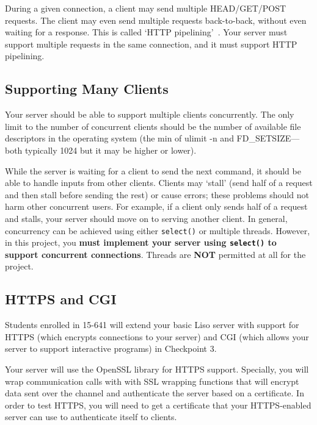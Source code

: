 \vspace{5pt}

 During a given connection, a client may send multiple HEAD/GET/POST requests.
The client may even send multiple requests back-to-back, without even waiting for a response.
This is called `HTTP pipelining'~\cite{pipelining}. Your server must support multiple requests in the same connection, and it must support HTTP pipelining.

\subsection{Supporting Many Clients}
Your server should be able to support multiple clients concurrently. The only
limit to the number of concurrent clients should be the number of available
file descriptors in the operating system (the min of ulimit -n and
FD\_SETSIZE---both typically 1024 but it may be higher or lower).  


While the server is waiting for a client to
send the next command, it should be able to handle inputs from other clients.
Clients may `stall' (send half of a request and then stall before sending the rest) or cause errors; these problems should not harm other concurrent users.
For example, if a client only sends half of a request and stalls, your server should move on to serving another client.
In general, concurrency can be achieved using either \texttt{select()} or
multiple threads. However, in this project, you \textbf{must implement your
server using \texttt{select()} to support concurrent connections}. Threads are
\textbf{NOT} permitted at all for the project. 

\subsection{HTTPS and CGI}
Students enrolled in 15-641 will extend your basic Liso server with support for HTTPS (which encrypts connections to your server) and CGI (which allows your server to support interactive programs) in Checkpoint 3.

\vspace{5pt}

Your server will use the OpenSSL library for HTTPS support.  Specially, you will wrap communication calls with with SSL wrapping functions that will encrypt data sent over the channel and authenticate the server based on a certificate.  
In order to test HTTPS, you will need to get a certificate that your HTTPS-enabled server can use to authenticate itself to clients.  

